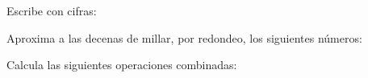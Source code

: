 \documentclass[addpoints,spanish, 12pt,a4paper]{exam}
\renewcommand*\half{.5}
\begin{document}
\begin{questions}

%
%
%



\question[0\half] Escribe con cifras:

\question[0\half] Aproxima a las decenas de millar, por redondeo, los siguientes números: 
\begin{multicols}{2}
\end{multicols}

\question[1\half] Calcula las siguientes operaciones combinadas:
\end{questions}
\end{document}
